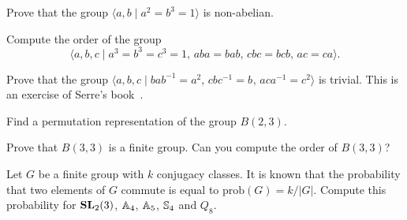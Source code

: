 \begin{prob}
Prove that the group $\langle a,b\mid a^2=b^3=1\rangle$ is non-abelian.
\end{prob}

\begin{prob}
\label{prob:order=648}
Compute the order of the group
\[
  \langle a,b,c\mid a^3=b^3=c^3=1,\,aba=bab,\,cbc=bcb,\,ac=ca\rangle.
\]
\end{prob}

\begin{prob}
	\label{prob:Serre}
	Prove that the group $\langle a,b,c\mid bab^{-1}=a^{2},\,cbc^{-1}=b^{},\,
	aca^{-1}=c^{2}\rangle$ is trivial. This is an exercise of Serre's
	book~\cite[\S1]{MR1954121}.
\end{prob}

\begin{prob}
	\label{prob:B23perm}
	Find a permutation representation of the group $B(2,3)$.
\end{prob}

\begin{prob}
	\label{prob:B33}
	Prove that 
	$B(3,3)$ %
	is a finite group. Can you compute the
	order of $B(3,3)$?
\end{prob}

\begin{prob}
	\label{prob:probability}
	Let $G$ be a finite group with $k$ conjugacy classes.  It is known that the
	probability that two elements of $G$ commute is equal to
	$\mathrm{prob}(G)=k/|G|$. Compute this probability for $\mathbf{SL}_2(3)$,
	$\mathbb{A}_4$, $\mathbb{A}_5$, $\mathbb{S}_4$ and $Q_8$.
\end{prob}


